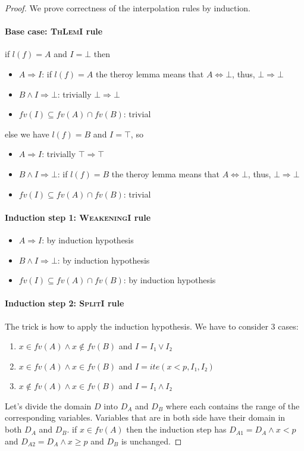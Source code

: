 \begin{proof}
We prove correctness of the interpolation rules by induction.
\paragraph{Base case: \textsc{ThLemI} rule}
if $l(f)=A$ and $I=⊥$ then
\begin{itemize}
\item $A ⇒ I$: if $l(f)=A$ the theroy lemma means that $A⇔⊥$, thus, $⊥⇒⊥$
\item $B ∧ I ⇒ ⊥$: trivially $⊥⇒⊥$
\item $fv(I) ⊆ fv(A) ∩ fv(B)$: trivial
\end{itemize}

else we have $l(f)=B$ and $I=\top$, so
\begin{itemize}
\item $A ⇒ I$: trivially $\top ⇒ \top$
\item $B ∧ I ⇒ ⊥$:  if $l(f)=B$ the theroy lemma means that $A⇔⊥$, thus, $⊥⇒⊥$
\item $fv(I) ⊆ fv(A) ∩ fv(B)$: trivial
\end{itemize}

\paragraph{Induction step 1: \textsc{WeakeningI} rule}
\begin{itemize}
\item $A ⇒ I$: by induction hypothesis
\item $B ∧ I ⇒ ⊥$: by induction hypothesis
\item $fv(I) ⊆ fv(A) ∩ fv(B)$: by induction hypothesis
\end{itemize}

\paragraph{Induction step 2: \textsc{SplitI} rule}
The trick is how to apply the induction hypothesis.
We have to consider 3 cases:
\begin{enumerate}
\item $x ∈ fv(A) ∧ x \notin fv(B)$ and $I = I₁ ∨ I₂$
\item $x ∈ fv(A) ∧ x ∈ fv(B)$ and $I = ite(x < p, I₁, I₂)$
\item $x \notin fv(A) ∧ x ∈ fv(B)$ and $I = I₁ ∧ I₂$
\end{enumerate}

Let's divide the domain $D$ into $D_A$ and $D_B$ where each contains the range of the corresponding variables.
Variables that are in both side have their domain in both $D_A$ and $D_B$. 
if $x\in fv(A)$ then the induction step has $D_{A1} = D_A ∧ x < p$ and $D_{A2} = D_A ∧ x ≥ p$ and $D_B$ is unchanged.


\end{proof}
